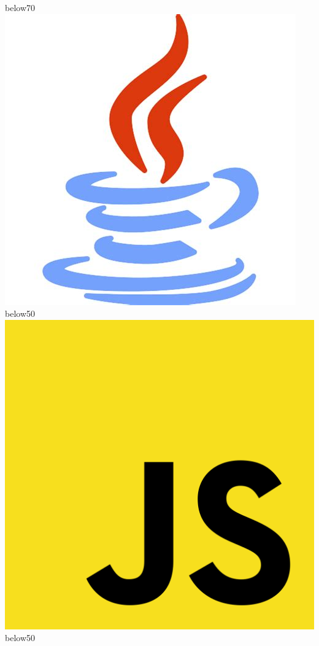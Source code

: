 \documentclass[blue]{pastelcv}              %
\begin{document}
\begin{paracol}{2}
  {}{below}{70}
  {\large\bf \includegraphics[width=\iconsizep]{java} }
  {}{below}{50}
  {\large\bf \includegraphics[width=\iconsizep]{js}}
  {}{below}{50}
\vspace{0.5em}


\end{paracol}
\end{document}

